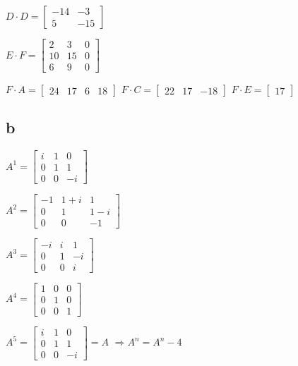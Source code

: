 \documentclass{article}
\begin{document}
$D\cdot D=\begin{bmatrix}
    -14&-3\\
    5&-15
\end{bmatrix}$


$E\cdot F=\begin{bmatrix}
    2&3&0\\
    10&15&0\\
    6&9&0
\end{bmatrix}$


$F\cdot A=\begin{bmatrix}
    24&17&6&18
\end{bmatrix}$
$F\cdot C=\begin{bmatrix}
    22&17&-18
\end{bmatrix}$
$F\cdot E=\begin{bmatrix}
    17
\end{bmatrix}$
\subsection*{b}
$A^1=\begin{bmatrix}
    i&1&0\\
    0&1&1\\
    0&0&-i
\end{bmatrix}$


$A^2=\begin{bmatrix}
    -1&1+i&1\\
    0&1&1-i\\
    0&0&-1
\end{bmatrix}$


$A^3=\begin{bmatrix}
    -i&i&1\\
    0&1&-i\\
    0&0&i
\end{bmatrix}$


$A^4=\begin{bmatrix}
    1&0&0\\
    0&1&0\\
    0&0&1
\end{bmatrix}$

$A^5=\begin{bmatrix}
    i&1&0\\
    0&1&1\\
    0&0&-i
\end{bmatrix}=A$
$\Rightarrow A^n=A^n-4$
\end{document}
